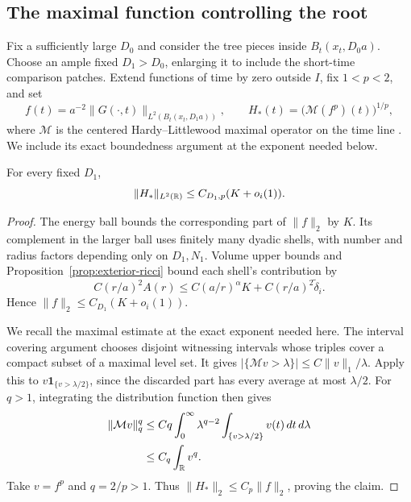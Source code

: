 \subsection{The maximal function controlling the root}
\label{para:maximal-subsection}

Fix a sufficiently large $D_0$ and consider the tree pieces inside
$B_t(x_t,D_0a)$.  Choose an ample fixed $D_1>D_0$, enlarging it to
include the short-time comparison patches.  Extend functions of time
by zero outside $I$, fix $1<p<2$, and set
\begin{equation}
 f(t)=a^{-2}\|G(\cdot,t)\|_{L^2(B_t(x_t,D_1a))},\qquad
 H_*(t)=\bigl(\mathcal M(f^p)(t)\bigr)^{1/p},
 \label{para:maximal-definition}
\end{equation}
where $\mathcal M$ is the centered Hardy--Littlewood maximal operator
on the time line \cite{HardyLittlewood1930}. We include its exact
boundedness argument at the exponent needed below.

\begin{lemma}
\label{para:maximal-lemma}
For every fixed $D_1$,
\begin{equation}
 \|H_*\|_{L^2(\mathbb{R})}\le C_{D_1,p}(K+o_i(1)).
 \label{eq:maximal-ricci}
\end{equation}
\end{lemma}

\begin{proof}
The energy ball bounds the corresponding part of $\|f\|_2$ by
$K$.  Its complement in the larger ball uses finitely many dyadic
shells, with number and radius factors depending only on $D_1,N_1$.
Volume upper bounds and Proposition~\ref{prop:exterior-ricci} bound
each shell's contribution by
\[
 C(r/a)^2A(r)\le C(a/r)^\alpha K
                       +C(r/a)^2\widetilde\delta_i.
\]
Hence $\|f\|_2\le C_{D_1}(K+o_i(1))$.

We recall the maximal estimate at the exact exponent needed here.
The interval covering argument chooses disjoint witnessing intervals
whose triples cover a compact subset of a maximal level set.  It
gives $|\{\mathcal Mv>\lambda\}|\le C\|v\|_1/\lambda$.
Apply this to $v\mathbf1_{\{v>\lambda/2\}}$, since the discarded
part has every average at most $\lambda/2$.  For $q>1$, integrating
the distribution function then gives
\[
 \begin{split}
 \|\mathcal Mv\|_q^q
 &\le Cq\int_0^\infty\lambda^{q-2}
                     \int_{\{v>\lambda/2\}}v(t)\,dt\,d\lambda\\
 &\le C_q\int_{\mathbb{R}} v^q.
 \end{split}
\]
Take $v=f^p$ and $q=2/p>1$.  Thus
$\|H_*\|_2\le C_p\|f\|_2$, proving the claim.
\end{proof}

